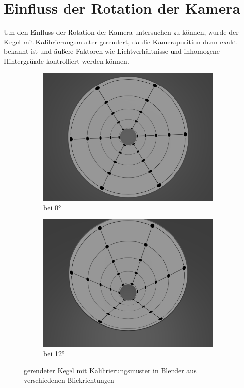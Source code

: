 \section{Einfluss der Rotation der Kamera}
Um den Einfluss der Rotation der Kamera untersuchen zu können, wurde der Kegel mit Kalibrierungsmuster gerendert, da die Kameraposition dann exakt bekannt ist und äußere Faktoren wie Lichtverhältnisse und inhomogene Hintergründe kontrolliert werden können. 

\begin{figure}[!htb]
	\centering
	\begin{subfigure}{.5\textwidth}
		\centering
		\includegraphics[width=.9\textwidth]{images/blender0.png}
		\caption{bei 0°}
	\end{subfigure}%
	\begin{subfigure}{.5\textwidth}
		\centering
		\includegraphics[width=.9\textwidth]{images/blender12.png}
		\caption{bei 12°}
	\end{subfigure}
	\label{fig:blender}
	\caption{gerendeter Kegel mit Kalibrierungsmuster in Blender aus verschiedenen Blickrichtungen}
\end{figure}


